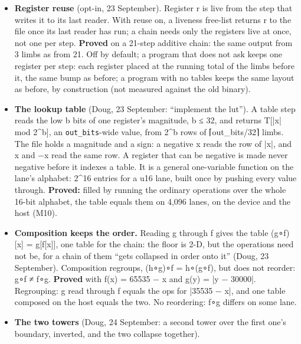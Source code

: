 \begin{itemize}
\begin{itemize}
\begin{itemize}
\item Every output bit is rebuilt from the raw fields one bit at a time, and each sign still holds 64 bits past its written width. This holds on 4,096 lanes in the 64-limb file and 512 in the 256-limb file.
\item Hand-worked answers match.
\item The narrowed widths are exactly the rule's: 32, 20, 20, 32, 41, 41, 32 and 32 over unsigned 32- and 20-bit fields and a signed 40-bit field. All 4,096 lanes equal the oracle past every narrowed width.
\item A wrap below 4 bits is refused at imprint (\texttt{test/\allowbreak{}engine/\allowbreak{}record\_\allowbreak{}bitwise\_\allowbreak{}test}, 24 checks, 0 failed).
\end{itemize}
\end{itemize}
\item \textbf{Register reuse} (opt-in, 23 September). Register r is live from the step that writes it to its last reader. With reuse on, a liveness free-list returns r to the file once its last reader has run; a chain needs only the registers live at once, not one per step. \textbf{Proved} on a 21-step additive chain: the same output from 3 limbs as from 21. Off by default; a program that does not ask keeps one register per step: each register placed at the running total of the limbs before it, the same bump as before; a program with no tables keeps the same layout as before, by construction (not measured against the old binary).
\item \textbf{The lookup table} (Doug, 23 September: “implement the lut”). A table step reads the low b bits of one register's magnitude, b ≤ 32, and returns T[|x| mod 2\textasciicircum{}b], an \texttt{out\_\allowbreak{}bits}-wide value, from 2\textasciicircum{}b rows of ⌈out\_\allowbreak{}bits/32⌉ limbs. The file holds a magnitude and a sign: a negative x reads the row of |x|, and x and −x read the same row. A register that can be negative is made never negative before it indexes a table. It is a general one-variable function on the lane's alphabet: 2\textasciicircum{}16 entries for a u16 lane, built once by pushing every value through. \textbf{Proved:} filled by running the ordinary operations over the whole 16-bit alphabet, the table equals them on 4,096 lanes, on the device and the host (M10).
\item \textbf{Composition keeps the order.} Reading g through f gives the table (g∘f)[x] = g[f[x]], one table for the chain: the floor is 2-D, but the operations need not be, for a chain of them “gets collapsed in order onto it” (Doug, 23 September). Composition regroups, (h∘g)∘f = h∘(g∘f), but does not reorder: g∘f ≠ f∘g. \textbf{Proved} with f(x) = 65535 − x and g(y) = |y − 30000|. Regrouping: g read through f equals the ops for |35535 − x|, and one table composed on the host equals the two. No reordering: f∘g differs on some lane.
\item \textbf{The two towers} (Doug, 24 September: a second tower over the first one's boundary, inverted, and the two collapse together).


\end{itemize}

